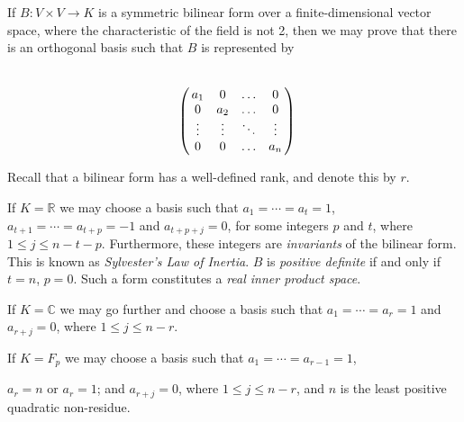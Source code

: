\documentclass[12pt]{article}
\begin{document}
If $B:V \times V \rightarrow K$ is a symmetric bilinear form 
over a finite-dimensional vector space, where the characteristic of the field is
not 2, 
then we may prove that there is an orthogonal basis such that $B$ is represented by 

$$
\bordermatrix{& \cr
& a_{1} &  0  & \ldots & 0\cr
& 0  &  a_{2} & \ldots & 0\cr
& \vdots & \vdots & \ddots & \vdots\cr
& 0  &   0       &\ldots & a_{n}\cr
}
$$

Recall that a bilinear form has a well-defined rank, and denote this by $r$.

If $K = \mathbb{R}$ we may choose a basis such that $a_1 = \cdots = a_t = 1$, 
$a_{t+1} = \cdots = a_{t+p} = -1$ and $a_{t+p+j} = 0$, for some integers $p$ and $t$,
where $1 \le j \le n-t-p$.
Furthermore, these integers are \emph{invariants} of the bilinear form. 
This is known as \emph{Sylvester's Law of Inertia}. 
$B$ is \emph{positive definite} if and only if
 $t = n$, $p = 0$. Such a form constitutes a \emph{real inner product space}.

If $K = \mathbb{C}$ we may go further and choose a basis such that $a_1 = \cdots = a_r = 1$ and 
$a_{r + j} = 0$, where $1 \le j \le n-r$.

If $K = F_p$ we may choose a basis such that $a_1 = \cdots = a_{r-1} = 1$, 
 
$a_r = n$ or $a_r = 1$; 
and $a_{r+j} = 0$, where $1 \le j \le n-r$, and 
 $n$ is the least positive quadratic non-residue.
\end{document}
